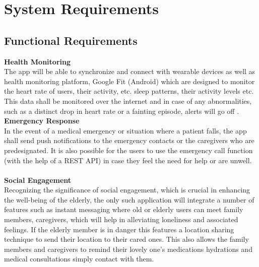 \section{System Requirements}
\subsection{Functional Requirements}
\textbf{Health Monitoring} \\[0.25cm]
 The app will be able to synchronize and connect with wearable devices as well as health monitoring platform, Google Fit (Android) which are designed to monitor the heart rate of users, their activity, etc. sleep patterns, their activity levels etc. This data shall be monitored over the internet and in case of any abnormalities, such as a distinct drop in heart rate or a fainting episode, alerts will go off \cite{jmirSmartphoneHealth}. 
 \\[0.25 cm]
\textbf{Emergency Response} \\[0.25cm]
In the event of a medical emergency or situation where a patient falls, the app shall send push notifications to the emergency contacts or the caregivers who are predesignated. It is also possible for the users to use the emergency call function (with the help of a REST API) in case they feel the need for help or are unwell. \\
\\[0.25 cm]
\textbf{Social Engagement} \\[0.25cm]
Recognizing the significance of social engagement, which is crucial in enhancing the well-being of the elderly, the only such application will integrate a number of features such as instant messaging where old or elderly users can meet family members, caregivers, which will help in alleviating loneliness and associated feelings. If the elderly member is in danger this features a location sharing technique to send their location to their cared ones. This also allows the family members and caregivers to remind their lovely one’s medications hydrations and medical consultations simply contact with them. \\
